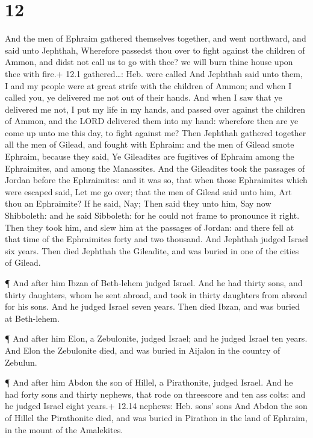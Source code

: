 \hypertarget{section-11}{%
\section{12}\label{section-11}}

 And the men of Ephraim gathered themselves together, and
went northward, and said unto Jephthah, Wherefore passedst thou over to
fight against the children of Ammon, and didst not call us to go with
thee? we will burn thine house upon thee with fire.+ 12.1
gathered\ldots: Heb. were called  And Jephthah said unto
them, I and my people were at great strife with the children of Ammon;
and when I called you, ye delivered me not out of their hands.
 And when I saw that ye delivered me not, I put my life in
my hands, and passed over against the children of Ammon, and the LORD
delivered them into my hand: wherefore then are ye come up unto me this
day, to fight against me?  Then Jephthah gathered together
all the men of Gilead, and fought with Ephraim: and the men of Gilead
smote Ephraim, because they said, Ye Gileadites are fugitives of Ephraim
among the Ephraimites, and among the Manassites.  And the
Gileadites took the passages of Jordan before the Ephraimites: and it
was so, that when those Ephraimites which were escaped said, Let me go
over; that the men of Gilead said unto him, Art thou an Ephraimite? If
he said, Nay;  Then said they unto him, Say now Shibboleth:
and he said Sibboleth: for he could not frame to pronounce it right.
Then they took him, and slew him at the passages of Jordan: and there
fell at that time of the Ephraimites forty and two thousand.
 And Jephthah judged Israel six years. Then died Jephthah
the Gileadite, and was buried in one of the cities of Gilead.

 ¶ And after him Ibzan of Beth-lehem judged Israel.
 And he had thirty sons, and thirty daughters, whom he sent
abroad, and took in thirty daughters from abroad for his sons. And he
judged Israel seven years.  Then died Ibzan, and was buried
at Beth-lehem.

 ¶ And after him Elon, a Zebulonite, judged Israel; and he
judged Israel ten years.  And Elon the Zebulonite died, and
was buried in Aijalon in the country of Zebulun.

 ¶ And after him Abdon the son of Hillel, a Pirathonite,
judged Israel.  And he had forty sons and thirty nephews,
that rode on threescore and ten ass colts: and he judged Israel eight
years.+ 12.14 nephews: Heb. sons' sons  And Abdon the son
of Hillel the Pirathonite died, and was buried in Pirathon in the land
of Ephraim, in the mount of the Amalekites.

